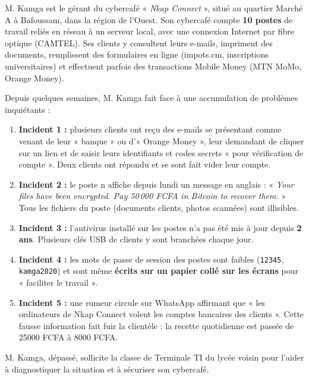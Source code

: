 \documentclass[11pt]{article}
\newcounter{popsec}
\newcounter{popsub}
\newcommand{\courssub}[1]{%
  \stepcounter{popsub}%
  \par\vspace{9pt}\noindent{\popxbold\fontsize{11.5}{13}\selectfont\color{popink}{\color{poporange}\thepopsec.\thepopsub}\hspace{6pt}#1}\par\nopagebreak\vspace{4pt}
}
\begin{document}
\courssub{Situation}

\begin{exemplebox}
M. Kamga est le gérant du cybercafé « \emph{Nkap Connect} », situé au quartier Marché A à Bafoussam, dans la région de l'Ouest. Son cybercafé compte \textbf{10 postes} de travail reliés en réseau à un serveur local, avec une connexion Internet par fibre optique (CAMTEL). Ses clients y consultent leurs e-mails, impriment des documents, remplissent des formulaires en ligne (impots.cm, inscriptions universitaires) et effectuent parfois des transactions Mobile Money (MTN MoMo, Orange Money).

Depuis quelques semaines, M. Kamga fait face à une accumulation de problèmes inquiétants :

\begin{enumerate}
  \item \textbf{Incident 1 :} plusieurs clients ont reçu des e-mails se présentant comme venant de leur « banque » ou d'« Orange Money », leur demandant de cliquer sur un lien et de saisir leurs identifiants et codes secrets « pour vérification de compte ». Deux clients ont répondu et se sont fait vider leur compte.
  \item \textbf{Incident 2 :} le poste n affiche depuis lundi un message en anglais : « \emph{Your files have been encrypted. Pay 50\,000 FCFA in Bitcoin to recover them.} » Tous les fichiers du poste (documents clients, photos scannées) sont illisibles.
  \item \textbf{Incident 3 :} l'antivirus installé sur les postes n'a pas été mis à jour depuis \textbf{2 ans}. Plusieurs clés USB de clients y sont branchées chaque jour.
  \item \textbf{Incident 4 :} les mots de passe de session des postes sont faibles (\texttt{12345}, \texttt{kamga2020}) et sont même \textbf{écrits sur un papier collé sur les écrans} pour « faciliter le travail ».
  \item \textbf{Incident 5 :} une rumeur circule sur WhatsApp affirmant que « les ordinateurs de Nkap Connect volent les comptes bancaires des clients ». Cette fausse information fait fuir la clientèle : la recette quotidienne est passée de \num{25000} FCFA à \num{8000} FCFA.
\end{enumerate}

M. Kamga, dépassé, sollicite la classe de Terminale TI du lycée voisin pour l'aider à diagnostiquer la situation et à sécuriser son cybercafé.
\end{exemplebox}
\end{document}
